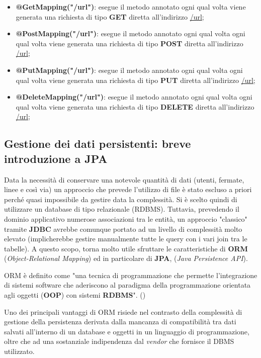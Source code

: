         \begin{itemize}
            \item \textbf{@GetMapping("/url")}: esegue il metodo annotato ogni qual volta viene generata una richiesta di tipo \textbf{GET} diretta all'indirizzo \url{/url};
            \item \textbf{@PostMapping("/url")}: esegue il metodo annotato ogni qual volta ogni qual volta viene generata una richiesta di tipo \textbf{POST} diretta all'indirizzo \url{/url};
            \item \textbf{@PutMapping("/url")}: esegue il metodo annotato ogni qual volta ogni qual volta viene generata una richiesta di tipo \textbf{PUT} diretta all'indirizzo \url{/url};
            \item \textbf{@DeleteMapping("/url")}: esegue il metodo annotato ogni qual volta ogni qual volta viene generata una richiesta di tipo \textbf{DELETE} diretta all'indirizzo \url{/url};
        \end{itemize}

    \subsection{Gestione dei dati persistenti: breve introduzione a JPA}
        Data la necessità di conservare una notevole quantità di dati (utenti, fermate, linee e così via) un approccio che prevede l'utilizzo di file è stato escluso a priori perché quasi impossibile da gestire data la complessità. Si è scelto quindi di utilizzare un database di tipo relazionale (RDBMS). Tuttavia, prevedendo il dominio applicativo numerose associazioni tra le entità, un approccio "classico" tramite \textbf{JDBC} avrebbe comunque portato ad un livello di complessità molto elevato (implicherebbe gestire manualmente tutte le query con i vari join tra le tabelle). A questo scopo, torna molto utile sfruttare le caratteristiche di \textbf{ORM} (\textit{Object-Relational Mapping}) ed in particolare di \textbf{JPA}, (\textit{Java Persistence API}).
        
        ORM è definito come "una tecnica di programmazione che permette l'integrazione di sistemi software che aderiscono al paradigma della programmazione orientata agli oggetti (\textbf{OOP}) con sistemi \textbf{RDBMS}". (\cite{wiki:orm})

        Uno dei principali vantaggi di ORM risiede nel contrasto della complessità di gestione della persistenza derivata dalla mancanza di compatibilità tra dati salvati all'interno di un database e oggetti in un linguaggio di programmazione, oltre che ad una sostanziale indipendenza dal \textit{vendor} che fornisce il DBMS utilizzato.
        
